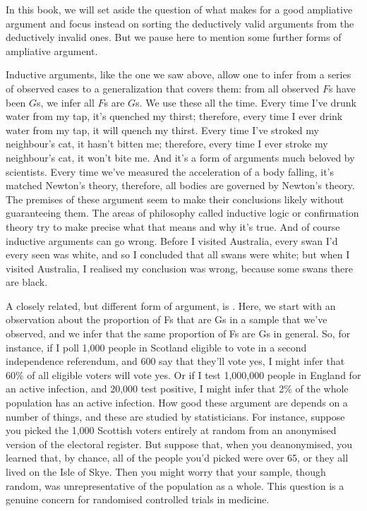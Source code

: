 In this book, we will set aside the question of what makes for a good ampliative argument and focus instead on sorting the deductively valid arguments from the deductively invalid ones.
But we pause here to mention some further forms of ampliative argument.

Inductive arguments, like the one we saw above, allow one to infer from a series of observed cases to a generalization that covers them: from all observed $F$s have been $G$s, we infer all $F$s are $G$s. We use these all the time. Every time I've drunk water from my tap, it's quenched my thirst; therefore, every time I ever drink water from my tap, it will quench my thirst. Every time I've stroked my neighbour's cat, it hasn't bitten me; therefore, every time I ever stroke my neighbour's cat, it won't bite me. And it's a form of arguments much beloved by scientists. Every time we've measured the acceleration of a body falling, it's matched Newton's theory, therefore, all bodies are governed by Newton's theory. The premises of these argument seem to make their conclusions likely without guaranteeing them. The areas of philosophy called inductive logic or confirmation theory try to make precise what that means and why it's true. And of course inductive arguments can go wrong. Before I visited Australia, every swan I'd every seen was white, and so I concluded that all swans were white; but when I visited Australia, I realised my conclusion was wrong, because some swans there are black.

A closely related, but different form of argument, is . Here, we start with an observation about the proportion of Fs that are Gs in a sample that we've observed, and we infer that the same proportion of Fs are Gs in general. So, for instance, if I poll 1,000 people in Scotland eligible to vote in a second independence referendum, and 600 say that they'll vote yes, I might infer that 60\% of all eligible voters will vote yes. Or if I test 1,000,000 people in England for an active infection, and 20,000 test positive, I might infer that 2\% of the whole population has an active infection. How good these argument are depends on a number of things, and these are studied by statisticians. For instance, suppose you picked the 1,000 Scottish voters entirely at random from an anonymised version of the electoral register. But suppose that, when you deanonymised, you learned that, by chance, all of the people you'd picked were over 65, or they all lived on the Isle of Skye. Then you might worry that your sample, though random, was unrepresentative of the population as a whole. This question is a genuine concern for randomised controlled trials in medicine.

